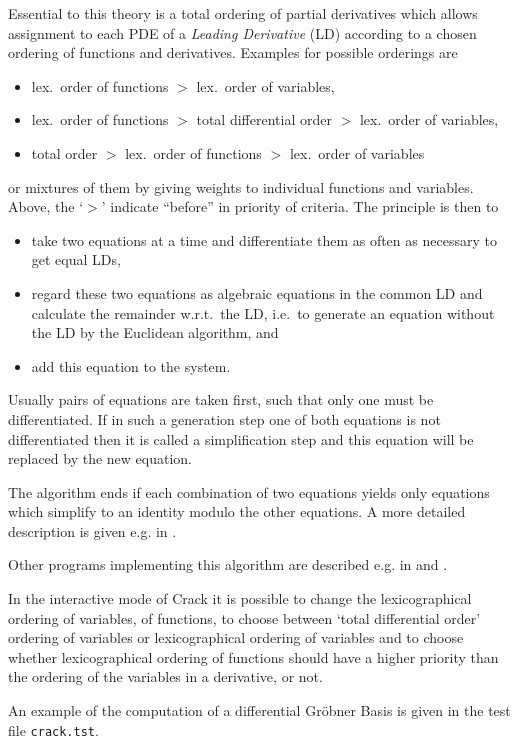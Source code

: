 \documentclass[12pt]{article}
\begin{document}
Essential to this theory is a total ordering of partial derivatives
which allows assignment to each PDE of a {\em Leading Derivative} 
(LD) according to a chosen ordering of functions
and derivatives. Examples for possible orderings are 
\begin{itemize}
\item lex.\ order of functions $>$ lex.\ order of variables,
\item lex.\ order of functions $>$ total differential order $>$ lex.\ 
      order of variables,
\item total order $>$ lex.\ order of functions $>$ lex.\ order of variables
\end{itemize}
or mixtures of them by giving weights to individual functions and variables.
Above, the `$>$' indicate ``before'' in priority of criteria. The principle
is then to
\begin{itemize}
\item take two equations at a time and differentiate them as often as 
necessary to get equal LDs,
\item regard these two equations as algebraic equations in
the common LD and calculate the remainder w.r.t.\ the LD, i.e.\ to
generate an equation without the LD by the Euclidean algorithm, and
\item add this equation to the system.
\end{itemize}
Usually pairs of equations are taken first, such that only one must be
differentiated. If in such a generation step one of both equations is not
differentiated then it is called a
simplification step and this equation will be replaced by the new equation.

The algorithm ends if each combination of two equations yields only equations
which simplify to an identity modulo the other equations.
A more detailed description is given e.g. in \cite{Alex,Reid1}.

Other programs implementing this algorithm are described e.g. in
\cite{FS,Alex,Fush,Reid1} and \cite{Mans}.

In the interactive mode of {\sc Crack} it is possible to change the
lexicographical ordering of variables, of functions, to choose between
`total differential order' ordering of variables or lexicographical
ordering of variables and to choose whether lexicographical ordering
of functions should have a higher priority than the ordering of the
variables in a derivative, or not.

An example of the computation of a differential Gr\"{o}bner Basis is
given in the test file {\tt crack.tst}.
\end{document}
